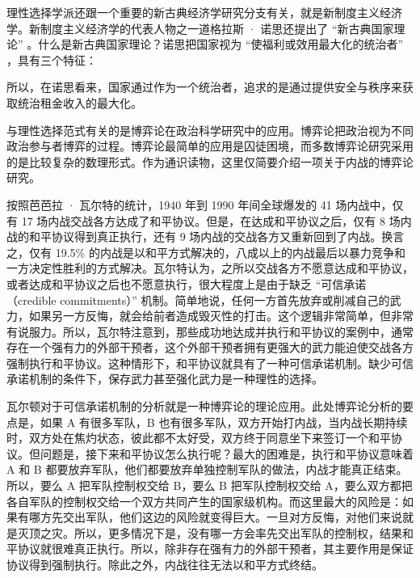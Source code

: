 理性选择学派还跟一个重要的新古典经济学研究分支有关，就是新制度主义经济学。新制度主义经济学的代表人物之一道格拉斯 · 诺思还提出了 “新古典国家理论” 。什么是新古典国家理论？诺思把国家视为 “使福利或效用最大化的统治者” ，具有三个特征：


所以，在诺思看来，国家通过作为一个统治者，追求的是通过提供安全与秩序来获取统治租金收入的最大化。

与理性选择范式有关的是博弈论在政治科学研究中的应用。博弈论把政治视为不同政治参与者博弈的过程。博弈论最简单的应用是囚徒困境，而多数博弈论研究采用的是比较复杂的数理形式。作为通识读物，这里仅简要介绍一项关于内战的博弈论研究。

按照芭芭拉 · 瓦尔特的统计，1940 年到 1990 年间全球爆发的 41 场内战中，仅有 17 场内战交战各方达成了和平协议。但是，在达成和平协议之后，仅有 8 场内战的和平协议得到真正执行，还有 9 场内战的交战各方又重新回到了内战。换言之，仅有 19.5\% 的内战是以和平方式解决的，八成以上的内战最后以暴力竞争和一方决定性胜利的方式解决。瓦尔特认为，之所以交战各方不愿意达成和平协议，或者达成和平协议之后也不愿意执行，很大程度上是由于缺乏 “可信承诺（credible commitments）” 机制。简单地说，任何一方首先放弃或削减自己的武力，如果另一方反悔，就会给前者造成毁灭性的打击。这个逻辑非常简单，但非常有说服力。所以，瓦尔特注意到，那些成功地达成并执行和平协议的案例中，通常存在一个强有力的外部干预者，这个外部干预者拥有更强大的武力能迫使交战各方强制执行和平协议。这种情形下，和平协议就具有了一种可信承诺机制。缺少可信承诺机制的条件下，保存武力甚至强化武力是一种理性的选择。

瓦尔顿对于可信承诺机制的分析就是一种博弈论的理论应用。此处博弈论分析的要点是，如果 A 有很多军队，B 也有很多军队，双方开始打内战，当内战长期持续时，双方处在焦灼状态，彼此都不太好受，双方终于同意坐下来签订一个和平协议。但问题是，接下来和平协议怎么执行呢？最大的困难是，执行和平协议意味着 A 和 B 都要放弃军队，他们都要放弃单独控制军队的做法，内战才能真正结束。所以，要么 A 把军队控制权交给 B，要么 B 把军队控制权交给 A，要么双方都把各自军队的控制权交给一个双方共同产生的国家级机构。而这里最大的风险是：如果有哪方先交出军队，他们这边的风险就变得巨大。一旦对方反悔，对他们来说就是灭顶之灾。所以，更多情况下是，没有哪一方会率先交出军队的控制权，结果和平协议就很难真正执行。所以，除非存在强有力的外部干预者，其主要作用是保证协议得到强制执行。除此之外，内战往往无法以和平方式终结。

